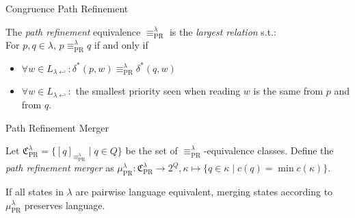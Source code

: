 \begin{frame}{Congruence Path Refinement}
	\begin{defn}
	The \emph{path refinement} equivalence $\equiv_\text{PR}^\lambda$ is the \emph{largest relation} s.t.: \\
	For $p, q \in \lambda$, $p \equiv_\text{PR}^\lambda q$ if and only if 
	\begin{itemize}
		\item $\forall w \in L_{\lambda \hookleftarrow}: \delta^*(p, w) \equiv_\text{PR}^\lambda \delta^*(q, w)$
		\item $\forall w \in L_{\lambda \hookleftarrow}:$ the smallest priority seen when reading $w$ is the same from $p$ and from $q$.
	\end{itemize}
	\end{defn}
\end{frame}



\begin{frame}{Path Refinement Merger}
\begin{defn}
	Let $\mathfrak{C}_\text{PR}^\lambda = \{ [q]_{\equiv_\text{PR}^\lambda} \mid q \in Q \}$ be the set of $\equiv_\text{PR}^\lambda$-equivalence classes. Define the \emph{path refinement merger} as $\mu_\text{PR}^\lambda : \mathfrak{C}_\text{PR}^\lambda \rightarrow 2^Q, \kappa \mapsto \{ q \in \kappa \mid c(q) = \min c(\kappa) \}$.
\end{defn}

\begin{theorem}
	If all states in $\lambda$ are pairwise language equivalent, merging states according to $\mu_\text{PR}^\lambda$ preserves language.
\end{theorem}
\end{frame}


